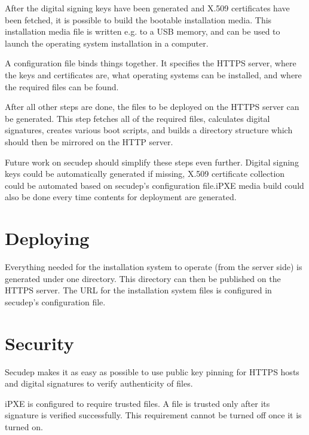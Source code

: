 After the digital signing keys have been generated and X.509
certificates have been fetched, it is possible to build the bootable
installation media. This installation media file is written e.g. to a
USB memory, and can be used to launch the operating system
installation in a computer.

A configuration file binds things together. It specifies the HTTPS
server, where the keys and certificates are, what operating systems
can be installed, and where the required files can be found.

After all other steps are done, the files to be deployed on the HTTPS
server can be generated. This step fetches all of the required files,
calculates digital signatures, creates various boot scripts, and
builds a directory structure which should then be mirrored on the HTTP
server.

Future work on secudep should simplify these steps even further.
Digital signing keys could be automatically generated if missing,
X.509 certificate collection could be automated based on secudep's
configuration file.\@ iPXE media build could also be done every time
contents for deployment are generated.

\section{Deploying}

Everything needed for the installation system to operate (from the
server side) is generated under one directory. This directory can then
be published on the HTTPS server. The URL for the installation system
files is configured in secudep's configuration file.

\section{Security}

Secudep makes it as easy as possible to use public key pinning for
HTTPS hosts and digital signatures to verify authenticity of files.

iPXE is configured to require trusted files. A file is trusted only
after its signature is verified successfully. This requirement cannot
be turned off once it is turned on.
